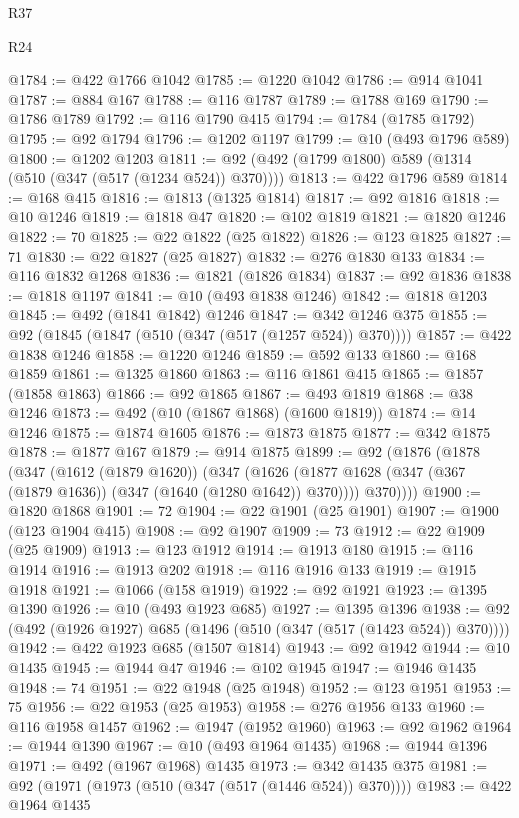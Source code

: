 \begin{lexlean}{R37}
\begin{lexlean}{R24}
\begin{coremodule}
{{{{{{{{{{{{{{{{{{{{{{{{{{{{{{{{{{{{{{{{{{{{{{{{{{{{{{{{{{{{{{{{{{{{{{{{{{{{{{{{{{{{{{{{{{{{{{{{{{{{{{{{{{{{{{{{{{{{{{{{{{{{{{{{{{{{{{{{{{{{{{{{{{{{{{{{{{{{{{{{{{{{{{{{{{{{{{{{{{{{{{{{{@1784 := @422 @1766 @1042
@1785 := @1220 @1042
@1786 := @914 @1041
@1787 := @884 @167
@1788 := @116 @1787
@1789 := @1788 @169
@1790 := @1786 @1789
@1792 := @116 @1790 @415
@1794 := @1784 (@1785 @1792)
@1795 := @92 @1794
@1796 := @1202 @1197
@1799 := @10 (@493 @1796 @589)
@1800 := @1202 @1203
@1811 := @92 (@492 (@1799 @1800) @589 (@1314 (@510 (@347 (@517 (@1234 @524)) @370))))
@1813 := @422 @1796 @589
@1814 := @168 @415
@1816 := @1813 (@1325 @1814)
@1817 := @92 @1816
@1818 := @10 @1246
@1819 := @1818 @47
@1820 := @102 @1819
@1821 := @1820 @1246
@1822 := 70
@1825 := @22 @1822 (@25 @1822)
@1826 := @123 @1825
@1827 := 71
@1830 := @22 @1827 (@25 @1827)
@1832 := @276 @1830 @133
@1834 := @116 @1832 @1268
@1836 := @1821 (@1826 @1834)
@1837 := @92 @1836
@1838 := @1818 @1197
@1841 := @10 (@493 @1838 @1246)
@1842 := @1818 @1203
@1845 := @492 (@1841 @1842) @1246
@1847 := @342 @1246 @375
@1855 := @92 (@1845 (@1847 (@510 (@347 (@517 (@1257 @524)) @370))))
@1857 := @422 @1838 @1246
@1858 := @1220 @1246
@1859 := @592 @133
@1860 := @168 @1859
@1861 := @1325 @1860
@1863 := @116 @1861 @415
@1865 := @1857 (@1858 @1863)
@1866 := @92 @1865
@1867 := @493 @1819
@1868 := @38 @1246
@1873 := @492 (@10 (@1867 @1868) (@1600 @1819))
@1874 := @14 @1246
@1875 := @1874 @1605
@1876 := @1873 @1875
@1877 := @342 @1875
@1878 := @1877 @167
@1879 := @914 @1875
@1899 := @92
    (@1876
      (@1878
        (@347
          (@1612 (@1879 @1620))
          (@347
            (@1626 (@1877 @1628 (@347 (@367 (@1879 @1636)) (@347 (@1640 (@1280 @1642)) @370))))
            @370))))
@1900 := @1820 @1868
@1901 := 72
@1904 := @22 @1901 (@25 @1901)
@1907 := @1900 (@123 @1904 @415)
@1908 := @92 @1907
@1909 := 73
@1912 := @22 @1909 (@25 @1909)
@1913 := @123 @1912
@1914 := @1913 @180
@1915 := @116 @1914
@1916 := @1913 @202
@1918 := @116 @1916 @133
@1919 := @1915 @1918
@1921 := @1066 (@158 @1919)
@1922 := @92 @1921
@1923 := @1395 @1390
@1926 := @10 (@493 @1923 @685)
@1927 := @1395 @1396
@1938 := @92 (@492 (@1926 @1927) @685 (@1496 (@510 (@347 (@517 (@1423 @524)) @370))))
@1942 := @422 @1923 @685 (@1507 @1814)
@1943 := @92 @1942
@1944 := @10 @1435
@1945 := @1944 @47
@1946 := @102 @1945
@1947 := @1946 @1435
@1948 := 74
@1951 := @22 @1948 (@25 @1948)
@1952 := @123 @1951
@1953 := 75
@1956 := @22 @1953 (@25 @1953)
@1958 := @276 @1956 @133
@1960 := @116 @1958 @1457
@1962 := @1947 (@1952 @1960)
@1963 := @92 @1962
@1964 := @1944 @1390
@1967 := @10 (@493 @1964 @1435)
@1968 := @1944 @1396
@1971 := @492 (@1967 @1968) @1435
@1973 := @342 @1435 @375
@1981 := @92 (@1971 (@1973 (@510 (@347 (@517 (@1446 @524)) @370))))
@1983 := @422 @1964 @1435
}}}}}}}}}}}}}}}}}}}}}}}}}}}}}}}}}}}}}}}}}}}}}}}}}}}}}}}}}}}}}}}}}}}}}}}}}}}}}}}}}}}}}}}}}}}}}}}}}}}}}}}}}}}}}}}}}}}}}}}}}}}}}}}}}}}}}}}}}}}}}}}}}}}}}}}}}}}}}}}}}}}}}}}}}}}}}}}}}}}}}}}}}
\end{coremodule}
\end{lexlean}
\end{lexlean}
